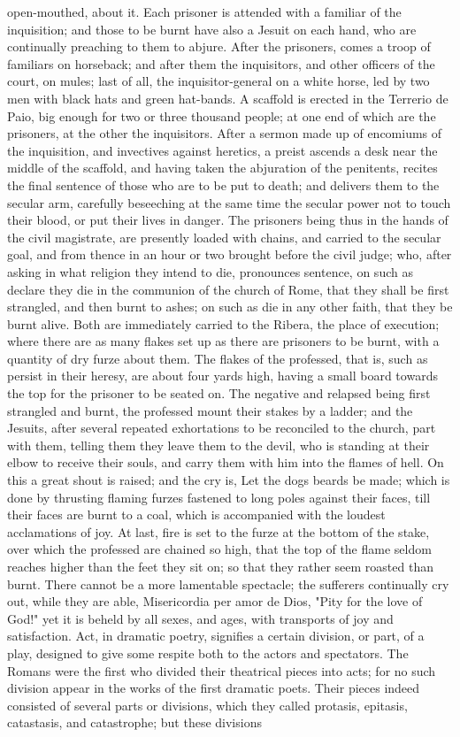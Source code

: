 \documentclass{article}
\begin{document}
open-mouthed, about it. Each prisoner is attended with a familiar of the inquisition; and those to be burnt have also a Jesuit on each hand, who are continually preaching to them to abjure. After the prisoners, comes a troop of familiars on horseback; and after them the inquisitors, and other officers of the court, on mules; last of all, the inquisitor-general on a white horse, led by two men with black hats and green hat-bands. A scaffold is erected in the Terrerio de Paio, big enough for two or three thousand people; at one end of which are the prisoners, at the other the inquisitors. After a sermon made up of encomiums of the inquisition, and invectives against heretics, a preist ascends a desk near the middle of the scaffold, and having taken the abjuration of the penitents, recites the final sentence of those who are to be put to death; and delivers them to the secular arm, carefully beseeching at the same time the secular power not to touch their blood, or put their lives in danger. The prisoners being thus in the hands of the civil magistrate, are presently loaded with chains, and carried to the secular goal, and from thence in an hour or two brought before the civil judge; who, after asking in what religion they intend to die, pronounces sentence, on such as declare they die in the communion of the church of Rome, that they shall be first strangled, and then burnt to ashes; on such as die in any other faith, that they be burnt alive. Both are immediately carried to the Ribera, the place of execution; where there are as many flakes set up as there are prisoners to be burnt, with a quantity of dry furze about them. The flakes of the professed, that is, such as persist in their heresy, are about four yards high, having a small board towards the top for the prisoner to be seated on. The negative and relapsed being first strangled and burnt, the professed mount their stakes by a ladder; and the Jesuits, after several repeated exhortations to be reconciled to the church, part with them, telling them they leave them to the devil, who is standing at their elbow to receive their souls, and carry them with him into the flames of hell. On this a great shout is raised; and the cry is, Let the dogs beards be made; which is done by thrusting flaming furzes fastened to long poles against their faces, till their faces are burnt to a coal, which is accompanied with the loudest acclamations of joy. At last, fire is set to the furze at the bottom of the stake, over which the professed are chained so high, that the top of the flame seldom reaches higher than the feet they sit on; so that they rather seem roasted than burnt. There cannot be a more lamentable spectacle; the sufferers continually cry out, while they are able, Misericordia per amor de Dios, "Pity for the love of God!" yet it is beheld by all sexes, and ages, with transports of joy and satisfaction. Act, in dramatic poetry, signifies a certain division, or part, of a play, designed to give some respite both to the actors and spectators. The Romans were the first who divided their theatrical pieces into acts; for no such division appear in the works of the first dramatic poets. Their pieces indeed consisted of several parts or divisions, which they called protasis, epitasis, catastasis, and catastrophe; but these divisions 
\end{document}
